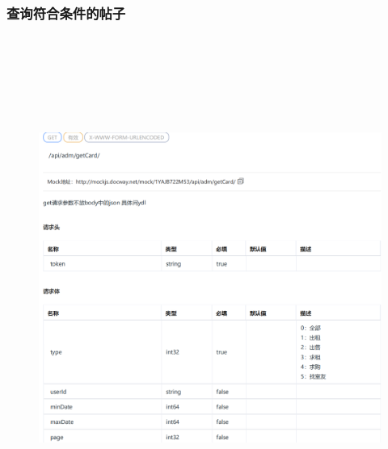 \subsubsection{查询符合条件的帖子}
\begin{figure}[h]
    \centering
    \includegraphics[height=16.5cm,width=14.0cm]{design/image/api34.png} 
    \end{figure}  
    \newpage
